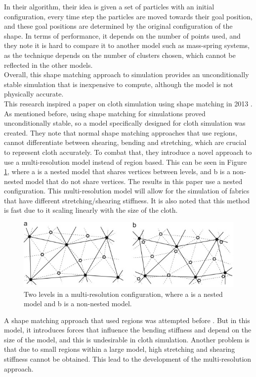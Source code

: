 \documentclass[12pt,a4paper]{article}
\begin{document}
In their algorithm, their idea is given a set of particles with an initial configuration, every time step the particles are moved towards their goal position, and these goal positions are determined by the original configuration of the shape. In terms of performance, it depends on the number of points used, and they note it is hard to compare it to another model such as mass-spring systems, as the technique depends on the number of clusters chosen, which cannot be reflected in the other models.\\
Overall, this shape matching approach to simulation provides an unconditionally stable simulation that is inexpensive to compute, although the model is not physically accurate.\\

This research inspired a paper on cloth simulation using shape matching in 2013 \cite{BENDER2013945}. As mentioned before, using shape matching for simulations proved unconditionally stable, so a model specifically designed for cloth simulation was created. They note that normal shape matching approaches that use regions, cannot differentiate between shearing, bending and stretching, which are crucial to represent cloth accurately. To combat that, they introduce a novel approach to use a multi-resolution model instead of region based. This can be seen in Figure \ref{fig:shape}, where a is a nested model that shares vertices between levels, and b is a non-nested model that do not share vertices. The results in this paper use a nested configuration. This multi-resolution model will allow for the simulation of fabrics that have different stretching/shearing stiffness. It is also noted that this method is fast due to it scaling linearly with the size of the cloth. \\

\begin{figure}[h]
	\includegraphics{shapeMatching.jpg}
	\caption{Two levels in a multi-resolution configuration, where a is a nested model and b is a non-nested model.}
	\label{fig:shape}
\end{figure} 
A shape matching approach that used regions was attempted before \cite{regionshapecloth}. But in this model, it introduces forces that influence the bending stiffness and depend on the size of the model, and this is undesirable in cloth simulation. Another problem is that due to small regions within a large model, high stretching and shearing stiffness cannot be obtained. This lead to the development of the multi-resolution approach.\\
\end{document}
